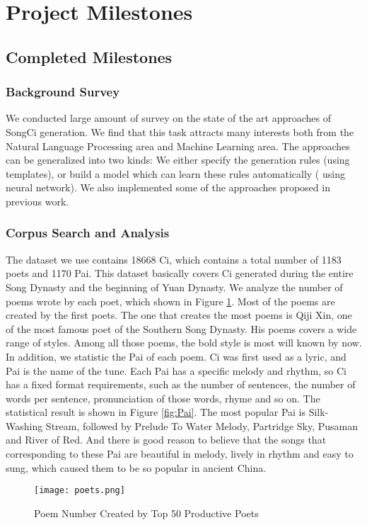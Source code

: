 \section{Project Milestones}

\subsection{Completed Milestones}
%
\subsubsection{Background Survey}
%
We conducted large amount of survey on the state of the art approaches of SongCi generation. 
%
We find that this task attracts many interests both from the Natural Language Processing area and Machine Learning area. 
%
The approaches can be generalized into two kinds:  We either specify the generation rules (using templates), or build a model which can learn these rules automatically ( using neural network).
%
We also implemented some of the approaches proposed in previous work.
% 
% 
%
\subsubsection {Corpus Search and Analysis}
%
The dataset we use contains 18668 Ci, which contains a total number of 1183 poets and 1170 Pai. This dataset basically covers Ci generated during the entire Song Dynasty and the beginning of Yuan Dynasty. We analyze the number of poems wrote by each poet, which shown in Figure \ref{fig:poet}. Most of the poems are created by the first poets. The one that creates the most poems is Qiji Xin, one of the most famous poet of the Southern Song Dynasty. His poems covers a wide range of styles. Among all those poems, the bold style is most will known by now. In addition, we statistic the Pai of each poem. Ci was first used as a lyric, and Pai is the name of the tune. Each Pai has a specific melody and rhythm, so Ci has a fixed format requirements, such as the number of sentences, the number of words per sentence, pronunciation of those words, rhyme and so on. The statistical result is shown in Figure \ref{fig:Pai}. The most popular Pai is Silk-Washing Stream, followed by Prelude To Water Melody, Partridge Sky, Pusaman and River of Red. And there is good reason to believe that the songs that corresponding to these Pai are beautiful in melody, lively in rhythm and easy to sung, which caused them to be so popular in ancient China.
\begin{figure}[htbp]
	\centering
	\texttt{[image: poets.png]}
	\caption{Poem Number Created by Top 50 Productive Poets}
	\label{fig:poet}
\end{figure}

